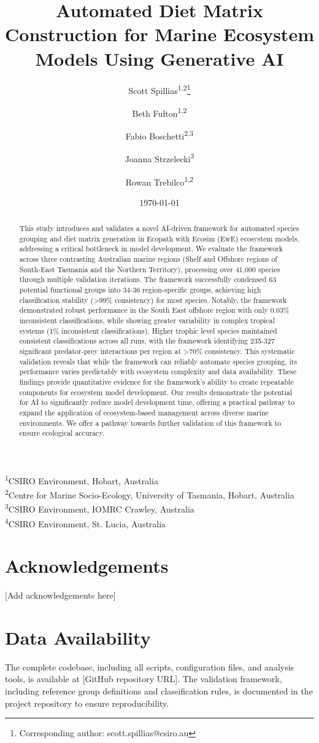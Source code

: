 \documentclass[12pt,a4paper]{article}
\title{Automated Diet Matrix Construction for Marine Ecosystem Models Using Generative AI}
\author{Scott Spillias\textsuperscript{1,2}\thanks{Corresponding author: scott.spillias@csiro.au} \and
Beth Fulton\textsuperscript{1,2} \and
Fabio Boschetti\textsuperscript{2,3} \and
Joanna Strzelecki\textsuperscript{3} \and
Rowan Trebilco\textsuperscript{1,2}}
\date{\today}  %
\newcommand{\affiliations}{
\noindent\textsuperscript{1}CSIRO Environment, Hobart, Australia\\
\textsuperscript{2}Centre for Marine Socio-Ecology, University of Tasmania, Hobart, Australia\\
\textsuperscript{3}CSIRO Environment, IOMRC Crawley, Australia\\
\textsuperscript{4}CSIRO Environment, St. Lucia, Australia
}
\begin{document}
\linenumbers
\maketitle
\affiliations

\begin{abstract}
This study introduces and validates a novel AI-driven framework for automated species grouping and diet matrix generation in Ecopath with Ecosim (EwE) ecosystem models, addressing a critical bottleneck in model development. We evaluate the framework across three contrasting Australian marine regions (Shelf and Offshore regions of South-East Tasmania and the Northern Territory), processing over 41,000 species through multiple validation iterations. The framework successfully condensed 63 potential functional groups into 34-36 region-specific groups, achieving high classification stability (>99\% consistency) for most species. Notably, the framework demonstrated robust performance in the South East offshore region with only 0.03\% inconsistent classifications, while showing greater variability in complex tropical systems (1\% inconsistent classifications). Higher trophic level species maintained consistent classifications across all runs, with the framework identifying 235-327 significant predator-prey interactions per region at >70\% consistency. This systematic validation reveals that while the framework can reliably automate species grouping, its performance varies predictably with ecosystem complexity and data availability. These findings provide quantitative evidence for the framework's ability to create repeatable components for ecosystem model development. Our results demonstrate the potential for AI to significantly reduce model development time, offering a practical pathway to expand the application of ecosystem-based management across diverse marine environments. We offer a pathway towards further validation of this framework to ensure ecological accuracy.
\end{abstract}






\section*{Acknowledgements}
[Add acknowledgements here]

\section*{Data Availability}
The complete codebase, including all scripts, configuration files, and analysis tools, is available at [GitHub repository URL]. The validation framework, including reference group definitions and classification rules, is documented in the project repository to ensure reproducibility.
\end{document}
